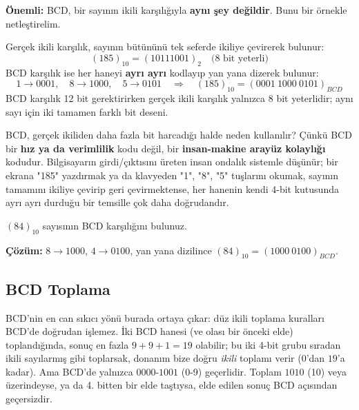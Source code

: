 \textbf{Önemli:} BCD, bir sayının ikili karşılığıyla \textbf{aynı şey değildir}. Bunu bir
örnekle netleştirelim.

\begin{ornek}
Gerçek ikili karşılık, sayının bütününü tek seferde ikiliye çevirerek bulunur:
\[
(185)_{10} = (10111001)_2 \quad \text{(8 bit yeterli)}
\]
BCD karşılık ise her haneyi \textbf{ayrı ayrı} kodlayıp yan yana dizerek bulunur:
\[
1\to0001,\quad 8\to1000,\quad 5\to0101 \quad\Rightarrow\quad (185)_{10}=(0001\ 1000\ 0101)_{BCD}
\]
BCD karşılık 12 bit gerektirirken gerçek ikili karşılık yalnızca 8 bit yeterlidir; aynı
sayı için iki tamamen farklı bit deseni.
\end{ornek}

BCD, gerçek ikiliden daha fazla bit harcadığı halde neden kullanılır? Çünkü BCD bir
\textbf{hız ya da verimlilik} kodu değil, bir \textbf{insan-makine arayüz kolaylığı} kodudur.
Bilgisayarın girdi/çıktısını üreten insan ondalık sistemle düşünür; bir ekrana "185"
yazdırmak ya da klavyeden "1", "8", "5" tuşlarını okumak, sayının tamamını ikiliye çevirip
geri çevirmektense, her hanenin kendi 4-bit kutusunda ayrı ayrı durduğu bir temsille çok
daha doğrudandır.

\begin{alistirma}[\kolay]
$(84)_{10}$ sayısının BCD karşılığını bulunuz.
\end{alistirma}

\noindent\textbf{Çözüm:} $8\to1000$, $4\to0100$, yan yana dizilince $(84)_{10}=(1000\
0100)_{BCD}$.

\subsection{BCD Toplama}
\label{sec:bcd-toplama}

BCD'nin en can sıkıcı yönü burada ortaya çıkar: düz ikili toplama kuralları BCD'de doğrudan
işlemez. İki BCD hanesi (ve olası bir önceki elde) toplandığında, sonuç en fazla $9+9+1=19$
olabilir; bu iki 4-bit grubu sıradan ikili sayılarmış gibi toplarsak, donanım bize doğru
\emph{ikili} toplamı verir ($0$'dan $19$'a kadar). Ama BCD'de yalnızca $0000$-$1001$ (0-9)
geçerlidir. Toplam $1010$ (10) veya üzerindeyse, ya da 4. bitten bir elde taştıysa, elde
edilen sonuç BCD açısından geçersizdir.

